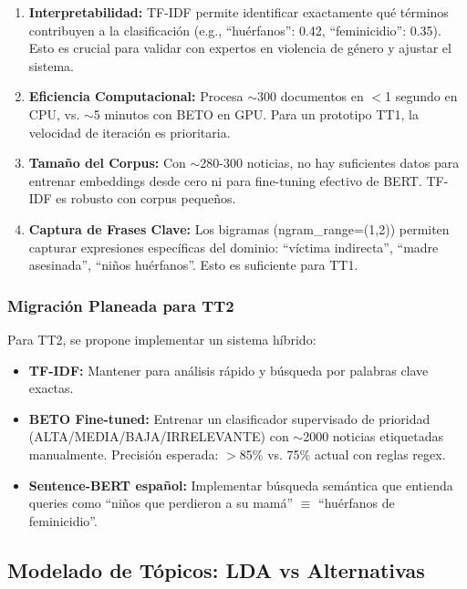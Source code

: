 \begin{enumerate}
    \item \textbf{Interpretabilidad:} TF-IDF permite identificar exactamente qué términos contribuyen a la clasificación (e.g., ``huérfanos'': 0.42, ``feminicidio'': 0.35). Esto es crucial para validar con expertos en violencia de género y ajustar el sistema.
    
    \item \textbf{Eficiencia Computacional:} Procesa $\sim$300 documentos en $<$1 segundo en CPU, vs. $\sim$5 minutos con BETO en GPU. Para un prototipo TT1, la velocidad de iteración es prioritaria.
    
    \item \textbf{Tamaño del Corpus:} Con $\sim$280-300 noticias, no hay suficientes datos para entrenar embeddings desde cero ni para fine-tuning efectivo de BERT. TF-IDF es robusto con corpus pequeños.
    
    \item \textbf{Captura de Frases Clave:} Los bigramas (ngram\_range=(1,2)) permiten capturar expresiones específicas del dominio: ``víctima indirecta'', ``madre asesinada'', ``niños huérfanos''. Esto es suficiente para TT1.
\end{enumerate}

\subsubsection{Migración Planeada para TT2}
\label{subsubsec:migracion_embeddings}

Para TT2, se propone implementar un sistema híbrido:

\begin{itemize}
    \item \textbf{TF-IDF:} Mantener para análisis rápido y búsqueda por palabras clave exactas.
    \item \textbf{BETO Fine-tuned:} Entrenar un clasificador supervisado de prioridad (ALTA/MEDIA/BAJA/IRRELEVANTE) con $\sim$2000 noticias etiquetadas manualmente. Precisión esperada: $>$85\% vs. 75\% actual con reglas regex.
    \item \textbf{Sentence-BERT español:} Implementar búsqueda semántica que entienda queries como ``niños que perdieron a su mamá'' $\equiv$ ``huérfanos de feminicidio''.
\end{itemize}

\subsection{Modelado de Tópicos: LDA vs Alternativas}
\label{subsec:modelado_topicos}

